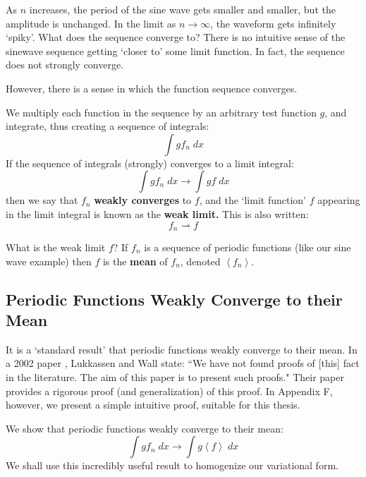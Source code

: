 \documentclass[12pt, a4paper, twoside, openright]{book}
\begin{document}
As $n$ increases, the period of the sine wave gets smaller and smaller, but the amplitude is unchanged.  In the limit as $n \to \infty$, the waveform gets infinitely `spiky'.  What does the sequence converge to?  There is no intuitive sense of the sinewave sequence getting `closer to' some limit function.  In fact, the sequence does not strongly converge.

However, there is a sense in which the function sequence converges. 

We multiply each function in the sequence by an arbitrary test function $g$, and integrate, thus creating a sequence of integrals:
\begin{equation}
\int g f_n \;dx
\end{equation}
If the sequence of integrals (strongly) converges to a limit integral:
\begin{equation}
\int g f_n \;dx \to \int g f \;dx
\end{equation}
then we say that $f_n$ \textbf{weakly converges} to $f$, and the `limit function' $f$ appearing in the limit integral is known as the \textbf{weak limit.}  This is also written:
\begin{equation}
f_n \rightharpoonup f
\end{equation}

What is the weak limit $f$?  If $f_n$ is a sequence of periodic functions (like our sine wave example) then $f$ is the \textbf{mean} of $f_n$, denoted $\left< f_n \right>  $.


\subsection{Periodic Functions Weakly Converge to their Mean}

It is a `standard result' that periodic functions weakly converge to their mean.  In a 2002 paper \cite{Lukkassen2002}, Lukkassen and Wall state: ``We have not found proofs of [this] fact in the literature.  The aim of this paper is to present such proofs."  Their paper provides a rigorous proof (and generalization) of this proof.  In Appendix F, however, we present a simple intuitive proof, suitable for this thesis.

We show that periodic functions weakly converge to their mean:
\begin{equation}
\int g f_n \;dx \to \int g \left< f \right> \;dx
\end{equation}
We shall use this incredibly useful result to homogenize our variational form.
\end{document}
